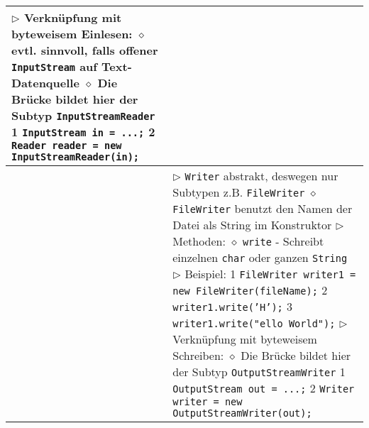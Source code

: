 \begin{longtable}{ | p{} p{} | }
{	$\rhd$ Verknüpfung mit byteweisem Einlesen: \\
	\hspace{0.4cm} $\diamond$ evtl. sinnvoll, falls offener \texttt{InputStream} auf Text-Datenquelle \\
	\hspace{0.4cm} $\diamond$ Die Brücke bildet hier der Subtyp \texttt{InputStreamReader} \\
	\hspace{0.4cm} 1 \hspace{0.1cm} \texttt{InputStream in = ...;} \\
	\hspace{0.4cm} 2 \hspace{0.1cm} \texttt{Reader reader = new InputStreamReader(in);}} \\ \hline

	\makecell[l]{Textdaten schreiben} & \makecell[l]{
	$\rhd$ \texttt{Writer} abstrakt, deswegen nur Subtypen z.B. \texttt{FileWriter} \\
	\hspace{0.4cm} $\diamond$ \texttt{FileWriter} benutzt den Namen der Datei als String im Konstruktor \\
	$\rhd$ Methoden: \\
	\hspace{0.4cm} $\diamond$ \texttt{write} \\
	\hspace{0.6cm} - Schreibt einzelnen \texttt{char} oder ganzen \texttt{String} \\
	$\rhd$ Beispiel: \\
	\hspace{0.4cm} 1 \hspace{0.1cm} \texttt{FileWriter writer1 = new FileWriter(fileName);} \\
	\hspace{0.4cm} 2 \hspace{0.1cm} \texttt{writer1.write('H');} \\
	\hspace{0.4cm} 3 \hspace{0.1cm} \texttt{writer1.write(\string"ello World\string");} \\ 
	$\rhd$ Verknüpfung mit byteweisem Schreiben: \\
	\hspace{0.4cm} $\diamond$ Die Brücke bildet hier der Subtyp \texttt{OutputStreamWriter} \\
	\hspace{0.4cm} 1 \hspace{0.1cm} \texttt{OutputStream out = ...;} \\
	\hspace{0.4cm} 2 \hspace{0.1cm} \texttt{Writer writer = new OutputStreamWriter(out);} } \\ \hline

	\end{longtable}


